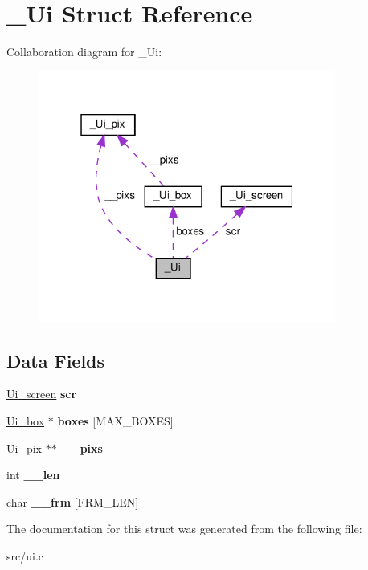 \hypertarget{struct__Ui}{}\section{\+\_\+\+Ui Struct Reference}
\label{struct__Ui}


Collaboration diagram for \+\_\+\+Ui\+:\nopagebreak
\begin{figure}[H]
\begin{center}
\leavevmode
\includegraphics[width=277pt]{struct__Ui__coll__graph}
\end{center}
\end{figure}
\subsection*{Data Fields}
\begin{DoxyCompactItemize}
\item 
\mbox{\label{struct__Ui_abd7c2a78bbdbe0e91a47a1461660b747}} 
\hyperlink{struct__Ui__screen}{Ui\+\_\+screen} {\bfseries scr}
\item 
\mbox{\label{struct__Ui_a04ed2c273edd9ab846366eeaba66f097}} 
\hyperlink{struct__Ui__box}{Ui\+\_\+box} $\ast$ {\bfseries boxes} \mbox{[}M\+A\+X\+\_\+\+B\+O\+X\+ES\mbox{]}
\item 
\mbox{\label{struct__Ui_a11af896bffe4bdbeca5ca871f7a9b7f0}} 
\hyperlink{struct__Ui__pix}{Ui\+\_\+pix} $\ast$$\ast$ {\bfseries \+\_\+\+\_\+pixs}
\item 
\mbox{\label{struct__Ui_a368b423615ed2b6852c1ca99fd6351ce}} 
int {\bfseries \+\_\+\+\_\+len}
\item 
\mbox{\label{struct__Ui_a6fa9582f3825e06799573007e6cfe9e8}} 
char {\bfseries \+\_\+\+\_\+frm} \mbox{[}F\+R\+M\+\_\+\+L\+EN\mbox{]}
\end{DoxyCompactItemize}


The documentation for this struct was generated from the following file\+:\begin{DoxyCompactItemize}
\item 
src/ui.\+c\end{DoxyCompactItemize}
